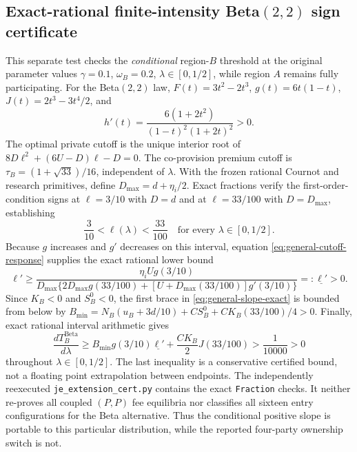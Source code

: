 \subsection{Exact-rational finite-intensity Beta$(2,2)$ sign certificate}
This separate test checks the \emph{conditional} region-$B$ threshold
at the original parameter values $\gamma=0.1$, $\omega_B=0.2$,
$\lambda\in[0,1/2]$, while region $A$ remains fully participating.
For the Beta$(2,2)$ law,
$F(t)=3t^2-2t^3$, $g(t)=6t(1-t)$,
$J(t)=2t^3-3t^4/2$, and
\[
 h'(t)=\frac{6(1+2t^2)}{(1-t)^2(1+2t)^2}>0.
\]
The optimal private cutoff is the unique interior root of
$8D\ell^2+(6U-D)\ell-D=0$. The co-provision premium
cutoff is $\tau_B=(1+\sqrt{33})/16$, independent of $\lambda$.
With the frozen rational Cournot and research primitives, define
$D_{\max}=d+\eta_i/2$. Exact fractions verify the first-order-condition
signs at $\ell=3/10$ with $D=d$ and at $\ell=33/100$ with
$D=D_{\max}$, establishing
\[
 \frac3{10}<\ell(\lambda)<\frac{33}{100}
 \quad\text{for every }\lambda\in[0,1/2].
\]
Because $g$ increases and $g'$ decreases on this interval, equation
\eqref{eq:general-cutoff-response} supplies the exact rational lower bound
\[
 \ell'\geq
 \frac{\eta_i U g(3/10)}{
 D_{\max}\{2D_{\max}g(33/100)
       +[U+D_{\max}(33/100)]g'(3/10)\}}
 =:\underline{\ell'}>0.
\]
Since $K_B<0$ and $S_B^0<0$, the first brace in
\eqref{eq:general-slope-exact} is bounded from below by
$B_{\min}=N_B(u_B+3d/10)+C S_B^0+C K_B(33/100)/4>0$.
Finally, exact rational interval arithmetic gives
\[
 \frac{dT_B^{\mathrm{Beta}}}{d\lambda}
 \geq B_{\min}g(3/10)\underline{\ell'}
       +\frac{CK_B}{2}J(33/100)
 >\frac1{10000}>0
\]
throughout $\lambda\in[0,1/2]$.
The last inequality is a conservative certified bound, not a floating
point extrapolation between endpoints. The independently reexecuted
\texttt{je\_extension\_cert.py} contains the exact
\texttt{Fraction} checks. It neither re-proves all coupled
$(P,P)$ fee equilibria nor classifies all sixteen entry
configurations for the Beta alternative. Thus the conditional positive
slope is portable to this particular distribution, while the
reported four-party ownership switch is not.

